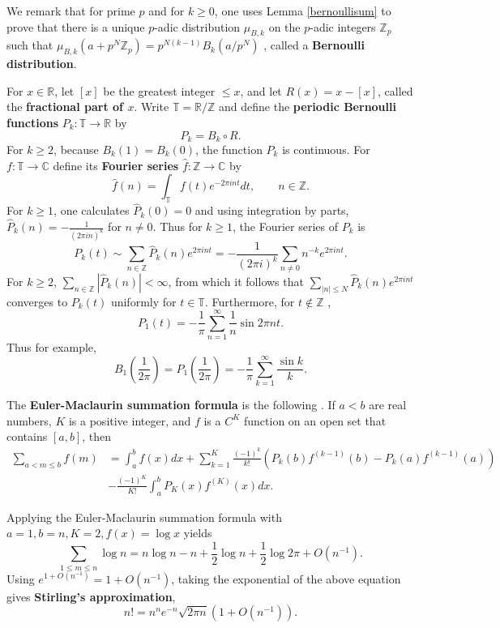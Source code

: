 \documentclass{article}
\begin{document}
We remark that for prime $p$ and for $k \geq 0$, one uses Lemma \ref{bernoullisum} to prove that
there is a unique $p$-adic distribution $\mu_{B,k}$ on the $p$-adic integers $\mathbb{Z}_p$ such that
$\mu_{B,k}(a+p^N \mathbb{Z}_p) = p^{N(k-1)} B_k(a/p^N)$ \cite[p.~35, Chapter II, \S 4]{koblitz},
called a \textbf{Bernoulli distribution}.





For $x \in \mathbb{R}$, let $[ x ]$ be the greatest integer $\leq x$, and let $R(x)=x-[x]$, called the \textbf{fractional part of $x$}.
Write $\mathbb{T}=\mathbb{R}/\mathbb{Z}$ and define the 
\textbf{periodic Bernoulli functions} $P_k:\mathbb{T} \to \mathbb{R}$ by
\[
P_k = B_k \circ R.
\] 
For $k \geq 2$, because $B_k(1)=B_k(0)$, the function $P_k$ is continuous. 
For $f:\mathbb{T} \to \mathbb{C}$ define its \textbf{Fourier series} $\hat{f}:\mathbb{Z} \to \mathbb{C}$ by
\[
\hat{f}(n) = \int_\mathbb{T} f(t) e^{-2\pi int} dt,\qquad n \in \mathbb{Z}.
\]
For $k \geq 1$, one calculates $\widehat{P}_k(0)=0$ and using integration by parts, $\widehat{P}_k(n)= - \frac{1}{(2\pi in)^k}$ for
$n \neq 0$.
Thus for $k \geq 1$, the Fourier series of $P_k$ is
\[
P_k(t) \sim \sum_{n \in \mathbb{Z}} \widehat{P}_k(n) e^{2\pi int} = -\frac{1}{(2\pi i)^k} \sum_{n \neq 0} n^{-k} e^{2\pi int}.
\]
For $k \geq 2$, $\sum_{n \in \mathbb{Z}} |\widehat{P}_k(n)|<\infty$, from which it follows that $\sum_{|n| \leq N}  \widehat{P}_k(n) e^{2\pi int}$
converges to $P_k(t)$ uniformly for $t \in \mathbb{T}$.
Furthermore, for $t \not \in \mathbb{Z}$  \cite[p.~499, Theorem B.2]{multiplicative},
\[
P_1(t) = - \frac{1}{\pi} \sum_{n=1}^\infty \frac{1}{n} \sin 2\pi nt.
\]
Thus for example,
\[
B_1\left(\frac{1}{2\pi} \right) = P_1\left(\frac{1}{2\pi} \right) = - \frac{1}{\pi} \sum_{k=1}^\infty \frac{\sin k}{k}.
\]


The \textbf{Euler-Maclaurin summation formula} is the following \cite[p.~500, Theorem B.5]{multiplicative}. If $a<b$ are real numbers,
$K$ is a positive integer, and $f$ is a $C^K$ function on an open set that contains $[a,b]$, then 
\begin{align*}
\sum_{a<m \leq b} f(m)&=\int_a^b f(x) dx + \sum_{k=1}^K \frac{(-1)^k}{k!} (P_k(b) f^{(k-1)}(b)-P_k(a) f^{(k-1)}(a))\\
&-\frac{(-1)^K}{K!} \int_a^b P_K(x)  f^{(K)}(x) dx.
\end{align*}

Applying the Euler-Maclaurin summation formula with $a=1, b=n, K=2, f(x)=\log x$ yields \cite[p.~503, Eq. B.25]{multiplicative}
\[
\sum_{1 \leq m \leq n} \log n = n \log n - n  + \frac{1}{2} \log n + \frac{1}{2} \log 2\pi + O(n^{-1}).
\]
Using $e^{1+O(n^{-1})} = 1+O(n^{-1})$, taking the exponential of the above equation gives \textbf{Stirling's approximation},
\[
n! = n^n e^{-n} \sqrt{2\pi n} (1+O(n^{-1})).
\]
\end{document}
